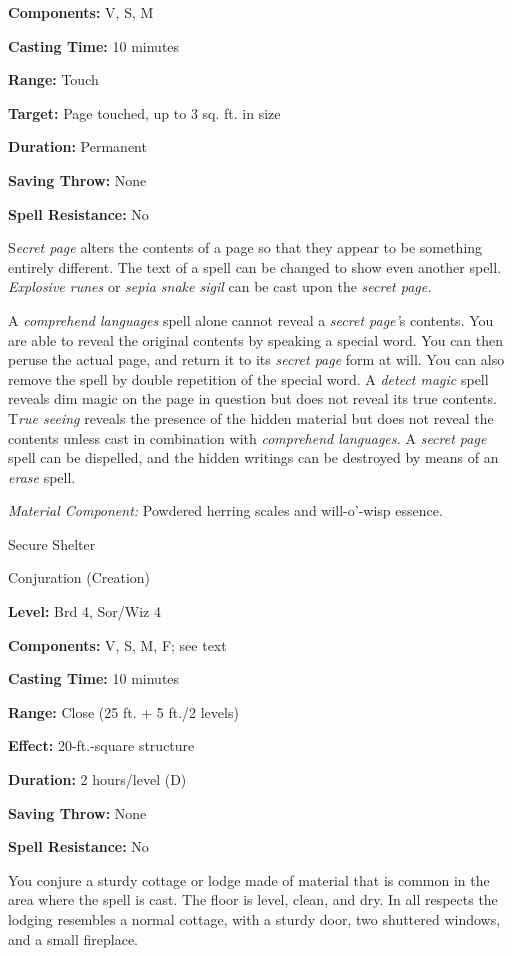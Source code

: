 \documentclass{article}
\begin{document}
\textbf{Components:} V, S, M

\textbf{Casting Time:} 10 minutes

\textbf{Range:} Touch

\textbf{Target:} Page touched, up to 3 sq. ft. in size

\textbf{Duration:} Permanent

\textbf{Saving Throw:} None

\textbf{Spell Resistance:} No

S\textit{ecret page }alters the contents of a page so that they appear to be something 
entirely different. The text of a spell can be changed to show even another spell. 
\textit{Explosive runes }or \textit{sepia snake sigil }can be cast upon the \textit{secret 
page.}

A \textit{comprehend languages }spell alone cannot reveal a \textit{secret page'}s 
contents. You are able to reveal the original contents by speaking a special word. 
You can then peruse the actual page, and return it to its \textit{secret page }form 
at will. You can also remove the spell by double repetition of the special word. 
A \textit{detect magic }spell reveals dim magic on the page in question but does 
not reveal its true contents. T\textit{rue seeing }reveals the presence of the 
hidden material but does not reveal the contents unless cast in combination with 
\textit{comprehend languages. }A \textit{secret page }spell can be dispelled, and 
the hidden writings can be destroyed by means of an \textit{erase }spell.

\textit{Material Component: }Powdered herring scales and will-o'-wisp essence.

\vspace{12pt}
Secure Shelter

Conjuration (Creation)

\textbf{Level:} Brd 4, Sor/Wiz 4

\textbf{Components:} V, S, M, F; see text

\textbf{Casting Time:} 10 minutes

\textbf{Range:} Close (25 ft. + 5 ft./2 levels)

\textbf{Effect:} 20-ft.-square structure

\textbf{Duration:} 2 hours/level (D)

\textbf{Saving Throw:} None

\textbf{Spell Resistance:} No

You conjure a sturdy cottage or lodge made of material that is common in the area 
where the spell is cast. The floor is level, clean, and dry. In all respects the 
lodging resembles a normal cottage, with a sturdy door, two shuttered windows, 
and a small fireplace.
\end{document}

